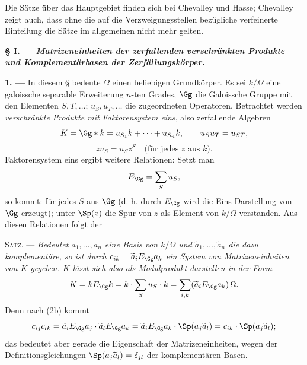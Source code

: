 Die Sätze über das Hauptgebiet finden sich bei Chevalley und Hasse; Chevalley zeigt auch, dass ohne die auf die Verzweigungsstellen bezügliche verfeinerte Einteilung die Sätze im allgemeinen nicht mehr gelten.

\begin{center}
\textbf{§ I. --- \emph{Matrizeneinheiten der zerfallenden verschränkten Produkte\\
und Komplementärbasen der Zerfällungskörper.}}
\end{center}

\noindent\textbf{1. ---} In diesem § bedeute $\Omega$ einen beliebigen Grundkörper. Es sei $k/\Omega$ eine galoissche separable Erweiterung $n$-ten Grades, $\Gg$ die Galoissche Gruppe mit den Elementen $S,T,\ldots$; $u_S,u_T,\ldots$ die zugeordneten Operatoren. Betrachtet werden \emph{verschränkte Produkte mit Faktorensystem eins}, also zerfallende Algebren
\[
K=\Gg\ast k=u_{S_1}k+\cdots+u_{S_n}k,\qquad u_Su_T=u_{ST},
\]
\[
zu_S=u_Sz^S\quad\text{(für jedes $z$ aus $k$)}.
\]
Faktorensystem eins ergibt weitere Relationen: Setzt man
\[
E_\Gg=\sum_Su_S,
\]
so kommt:
für jedes $S$ aus $\Gg$ (d. h. durch $E_\Gg$ wird die Eins-Darstellung von $\Gg$ erzeugt);
unter $\Sp(z)$ die Spur von $z$ als Element von $k/\Omega$ verstanden. Aus diesen Relationen folgt der

\medskip
\noindent\textsc{Satz. ---} \emph{Bedeutet $a_1,\ldots,a_n$ eine Basis von $k/\Omega$ und $\widetilde a_1,\ldots,\widetilde a_n$ die dazu komplementäre, so ist durch $c_{ik}=\widetilde a_iE_\Gg a_k$ ein System von Matrizeneinheiten von $K$ gegeben. $K$ lässt sich also als Modulprodukt darstellen in der Form}
\[
K=kE_\Gg k=k\cdot\sum_Su_S\cdot k
 =\sum_{i,k}(\widetilde a_iE_\Gg a_k)\,\Omega.
\]
Denn nach (2b) kommt
\[
c_{ij}c_{lk}
 =\widetilde a_iE_\Gg a_j\cdot\widetilde a_lE_\Gg a_k
 =\widetilde a_iE_\Gg a_k\cdot\Sp(a_j\widetilde a_l)
 =c_{ik}\cdot\Sp(a_j\widetilde a_l);
\]
das bedeutet aber gerade die Eigenschaft der Matrizeneinheiten, wegen der Definitionsgleichungen $\Sp(a_j\widetilde a_l)=\delta_{jl}$ der komplementären Basen.

